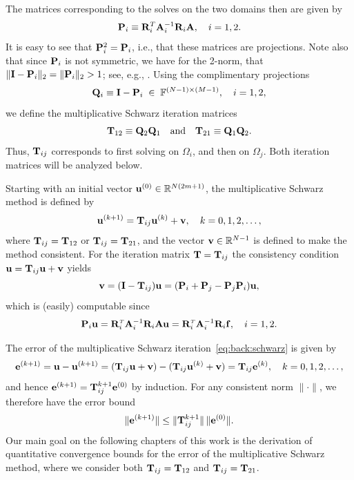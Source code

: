 The matrices corresponding to the solves on the two domains then are given by
%
\begin{equation}\label{eq:back:Pi}
\P_i\equiv \R_i^T\A_i^{-1}\R_i\A,\quad i=1,2.
\end{equation}
%
It is easy to see that $\P_i^2=\P_i$, i.e., that these matrices are projections.
Note also that since $\P_i$ is not symmetric, we have for the 2-norm,
that $\|\I-\P_i\|_2 = \|\P_i\|_2 > 1$; see, e.g., \cite{Szy06}. Using the
complimentary projections
%
$$\Q_i\equiv \I-\P_i\;\in\;\mathbb{F}^{(N-1)\times (M-1)},\quad i=1,2,$$
%
we define the multiplicative Schwarz iteration matrices
%
\begin{equation}\label{eq:back:Tij}
\T_{12}\equiv \Q_2\Q_1\quad\mbox{and}\quad \T_{21}\equiv \Q_1\Q_2.
\end{equation}
%
Thus, $\T_{ij}$ corresponds to first solving on $\Omega_i$, and then on
$\Omega_j$. Both iteration matrices will be analyzed below.

Starting with an initial vector $\u^{(0)}\in{\mathbb R}^{N(2m+ 1)}$,
the multiplicative Schwarz method is defined by
%
\begin{equation}\label{eq:back:schwarz}
\u^{(k+1)}=\T_{ij} \u^{(k)}+\v, \quad k=0,1,2,\dots,
\end{equation}
%
where $\T_{ij}=\T_{12}$ or $\T_{ij}=\T_{21}$, and the vector
$\v\in {\mathbb R}^{N-1}$ is defined to make the method consistent.
For the iteration matrix $\T=\T_{ij}$ the consistency condition
$\u=\T_{ij}\u+\v$ yields
$$
\v = (\I-\T_{ij})\u = (\P_i+\P_j-\P_j\P_i)\u,
$$
which is (easily) computable since
$$
\P_i\u=\R_i^{\Tr}\A_i^{-1}\R_i\A\u=\R_i^{\Tr}\A_i^{-1}\R_i\f,\quad i=1,2.
$$

The error of the multiplicative Schwarz iteration~\eqref{eq:back:schwarz} is
given by
\begin{equation}\label{eq:back:schwarz_err}
\e^{(k+1)}=\u-\u^{(k+1)}=(\T_{ij}\u + \v)- (\T_{ij} \u^{(k)}+\v)=\T_{ij} \e^{(k)},
\quad k=0,1,2,\dots,
\end{equation}
and hence $\e^{(k+1)}=\T_{ij}^{k+1} \e^{(0)}$ by induction.
For any consistent norm $\|\cdot\|$, we therefore have the error bound
%
\begin{equation}\label{eq:back:error}
\|\e^{(k+1)}\|\leq \|\T_{ij}^{k+1}\|\,\|\e^{(0)}\|.
\end{equation}
%
Our main goal on the following chapters of this work is the derivation of
quantitative convergence bounds for the error of the multiplicative Schwarz method, where we consider both
$\T_{ij}=\T_{12}$ and $\T_{ij}=\T_{21}$.

